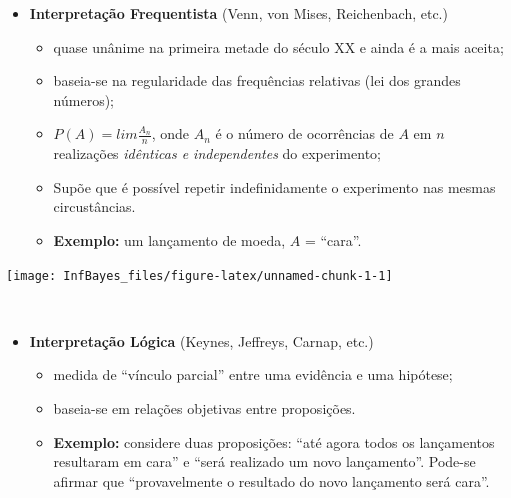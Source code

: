 \documentclass[
]{book}
\providecommand{\tightlist}{%
  \setlength{\itemsep}{0pt}\setlength{\parskip}{0pt}}
\begin{document}
\begin{itemize}
\tightlist
\item
  \textbf{Interpretação Frequentista} (Venn, von Mises, Reichenbach, etc.)

  \begin{itemize}
  \tightlist
  \item
    quase unânime na primeira metade do século XX e ainda é a mais aceita;
  \item
    baseia-se na regularidade das frequências relativas (lei dos grandes números);
  \item
    \(P(A) = lim \frac{A_n}{n}\), onde \(A_n\) é o número de ocorrências de \(A\) em \(n\) realizações \emph{idênticas e independentes} do experimento;
  \item
    Supõe que é possível repetir indefinidamente o experimento nas mesmas circustâncias.
  \item
    \textbf{Exemplo:} um lançamento de moeda, \(A\) = ``cara''.
  \end{itemize}
\end{itemize}

\begin{center}\texttt{[image: InfBayes\_files/figure-latex/unnamed-chunk-1-1]} \end{center}

\(~\)

\begin{itemize}
\tightlist
\item
  \textbf{Interpretação Lógica} (Keynes, Jeffreys, Carnap, etc.)

  \begin{itemize}
  \tightlist
  \item
    medida de ``vínculo parcial'' entre uma evidência e uma hipótese;
  \item
    baseia-se em relações objetivas entre proposições.
  \item
    \textbf{Exemplo:} considere duas proposições: ``até agora todos os lançamentos resultaram em cara'' e ``será realizado um novo lançamento''. Pode-se afirmar que ``provavelmente o resultado do novo lançamento será cara''.
  \end{itemize}
\end{itemize}

\(~\)
\end{document}
